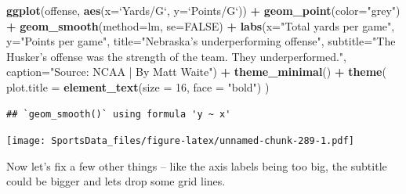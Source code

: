 \documentclass[
]{book}
\newenvironment{Shaded}{\begin{snugshade}}{\end{snugshade}}
\newcommand{\DataTypeTok}[1]{\textcolor[rgb]{0.13,0.29,0.53}{#1}}
\newcommand{\DecValTok}[1]{\textcolor[rgb]{0.00,0.00,0.81}{#1}}
\newcommand{\KeywordTok}[1]{\textcolor[rgb]{0.13,0.29,0.53}{\textbf{#1}}}
\newcommand{\NormalTok}[1]{#1}
\newcommand{\OperatorTok}[1]{\textcolor[rgb]{0.81,0.36,0.00}{\textbf{#1}}}
\newcommand{\OtherTok}[1]{\textcolor[rgb]{0.56,0.35,0.01}{#1}}
\newcommand{\StringTok}[1]{\textcolor[rgb]{0.31,0.60,0.02}{#1}}
\begin{document}
\begin{Shaded}
\begin{Highlighting}[]
\KeywordTok{ggplot}\NormalTok{(offense, }\KeywordTok{aes}\NormalTok{(}\DataTypeTok{x=}\StringTok{`}\DataTypeTok{Yards/G}\StringTok{`}\NormalTok{, }\DataTypeTok{y=}\StringTok{`}\DataTypeTok{Points/G}\StringTok{`}\NormalTok{)) }\OperatorTok{+}\StringTok{ }
\StringTok{  }\KeywordTok{geom_point}\NormalTok{(}\DataTypeTok{color=}\StringTok{"grey"}\NormalTok{) }\OperatorTok{+}\StringTok{ }\KeywordTok{geom_smooth}\NormalTok{(}\DataTypeTok{method=}\NormalTok{lm, }\DataTypeTok{se=}\OtherTok{FALSE}\NormalTok{) }\OperatorTok{+}\StringTok{ }
\StringTok{  }\KeywordTok{labs}\NormalTok{(}\DataTypeTok{x=}\StringTok{"Total yards per game"}\NormalTok{, }\DataTypeTok{y=}\StringTok{"Points per game"}\NormalTok{, }\DataTypeTok{title=}\StringTok{"Nebraska's underperforming offense"}\NormalTok{, }\DataTypeTok{subtitle=}\StringTok{"The Husker's offense was the strength of the team. They underperformed."}\NormalTok{, }\DataTypeTok{caption=}\StringTok{"Source: NCAA | By Matt Waite"}\NormalTok{) }\OperatorTok{+}\StringTok{ }
\StringTok{  }\KeywordTok{theme_minimal}\NormalTok{() }\OperatorTok{+}\StringTok{ }
\StringTok{  }\KeywordTok{theme}\NormalTok{(}
    \DataTypeTok{plot.title =} \KeywordTok{element_text}\NormalTok{(}\DataTypeTok{size =} \DecValTok{16}\NormalTok{, }\DataTypeTok{face =} \StringTok{"bold"}\NormalTok{)}
\NormalTok{    ) }
\end{Highlighting}
\end{Shaded}

\begin{verbatim}
## `geom_smooth()` using formula 'y ~ x'
\end{verbatim}

\texttt{[image: SportsData\_files/figure-latex/unnamed-chunk-289-1.pdf]}

Now let's fix a few other things -- like the axis labels being too big, the subtitle could be bigger and lets drop some grid lines.
\end{document}
